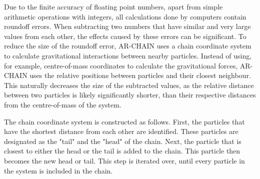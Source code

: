 \documentclass[english, twoside]{HYgradu}
\begin{document}
Due to the finite accuracy of floating point numbers, apart from simple arithmetic operations with integers, all calculations done by computers contain roundoff errors. When subtracting two numbers that have similar and very large values from each other, the effects caused by these errors can be significant. To reduce the size of the roundoff error, AR-CHAIN uses a chain coordinate system to calculate gravitational interactions between nearby particles. Instead of using, for example, centre-of-mass coordinates to calculate the gravitational forces, AR-CHAIN uses the relative positions between particles and their closest neighbour. This naturally decreases the size of the subtracted values, as the relative distance between two particles is likely significantly shorter, than their respective distances from the centre-of-mass of the system.

The chain coordinate system is constructed as follows. First, the particles that have the shortest distance from each other are identified. These particles are designated as the "tail" and the "head" of the chain. Next, the particle that is closest to either the head or the tail is added to the chain. This particle then becomes the new head or tail. This step is iterated over, until every particle in the system is included in the chain.
\end{document}
